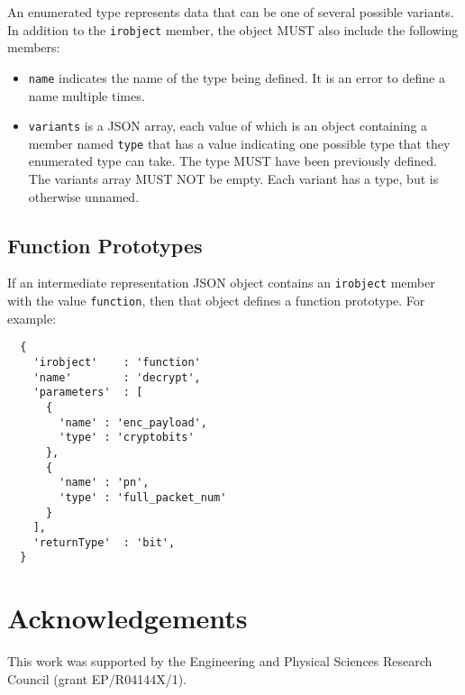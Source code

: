 \documentclass[twocolumn,a4paper]{article}
\begin{document}
An enumerated type represents data that can be one of several possible
variants. In addition to the \texttt{irobject} member, the object MUST
also include the following members:
\begin{itemize}
  \item \texttt{name} indicates the name of the type being defined. It is
    an error to define a name multiple times.
  \item \texttt{variants} is a JSON array, each value of which is an object
    containing a member named \texttt{type} that has a value indicating one
    possible type that they enumerated type can take. The type MUST have
    been previously defined.  The variants array MUST NOT be empty. Each
    variant has a type, but is otherwise unnamed.
\end{itemize}

\subsection{Function Prototypes}
\label{sec:funcs}

If an intermediate representation JSON object contains an \texttt{irobject}
member with the value \texttt{function}, then that object defines a function
prototype. For example:

\begin{verbatim}
  {
    'irobject'    : 'function'
    'name'        : 'decrypt',
    'parameters'  : [
      {
        'name' : 'enc_payload',
        'type' : 'cryptobits'
      },
      {
        'name' : 'pn',
        'type' : 'full_packet_num'
      }
    ],
    'returnType'  : 'bit',
  }
\end{verbatim}

\section{Acknowledgements}

This work was supported by the Engineering and Physical Sciences Research
Council (grant EP/R04144X/1).
\end{document}
